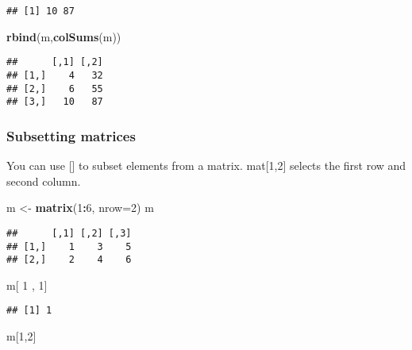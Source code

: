 \documentclass[
]{article}
\newenvironment{Shaded}{\begin{snugshade}}{\end{snugshade}}
\newcommand{\DataTypeTok}[1]{\textcolor[rgb]{0.13,0.29,0.53}{#1}}
\newcommand{\DecValTok}[1]{\textcolor[rgb]{0.00,0.00,0.81}{#1}}
\newcommand{\KeywordTok}[1]{\textcolor[rgb]{0.13,0.29,0.53}{\textbf{#1}}}
\newcommand{\NormalTok}[1]{#1}
\newcommand{\OperatorTok}[1]{\textcolor[rgb]{0.81,0.36,0.00}{\textbf{#1}}}
\newcommand{\StringTok}[1]{\textcolor[rgb]{0.31,0.60,0.02}{#1}}
\begin{document}
\begin{verbatim}
## [1] 10 87
\end{verbatim}

\begin{Shaded}
\begin{Highlighting}[]
\KeywordTok{rbind}\NormalTok{(m,}\KeywordTok{colSums}\NormalTok{(m))}
\end{Highlighting}
\end{Shaded}

\begin{verbatim}
##      [,1] [,2]
## [1,]    4   32
## [2,]    6   55
## [3,]   10   87
\end{verbatim}

\hypertarget{subsetting-matrices}{%
\subsubsection{Subsetting matrices}\label{subsetting-matrices}}

You can use {[}{]} to subset elements from a matrix. mat{[}1,2{]}
selects the first row and second column.

\begin{Shaded}
\begin{Highlighting}[]
\NormalTok{m <-}\StringTok{ }\KeywordTok{matrix}\NormalTok{(}\DecValTok{1}\OperatorTok{:}\DecValTok{6}\NormalTok{, }\DataTypeTok{nrow=}\DecValTok{2}\NormalTok{)}
\NormalTok{m}
\end{Highlighting}
\end{Shaded}

\begin{verbatim}
##      [,1] [,2] [,3]
## [1,]    1    3    5
## [2,]    2    4    6
\end{verbatim}

\begin{Shaded}
\begin{Highlighting}[]
\NormalTok{m[ }\DecValTok{1}\NormalTok{ , }\DecValTok{1}\NormalTok{]}
\end{Highlighting}
\end{Shaded}

\begin{verbatim}
## [1] 1
\end{verbatim}

\begin{Shaded}
\begin{Highlighting}[]
\NormalTok{m[}\DecValTok{1}\NormalTok{,}\DecValTok{2}\NormalTok{]}
\end{Highlighting}
\end{Shaded}
\end{document}

